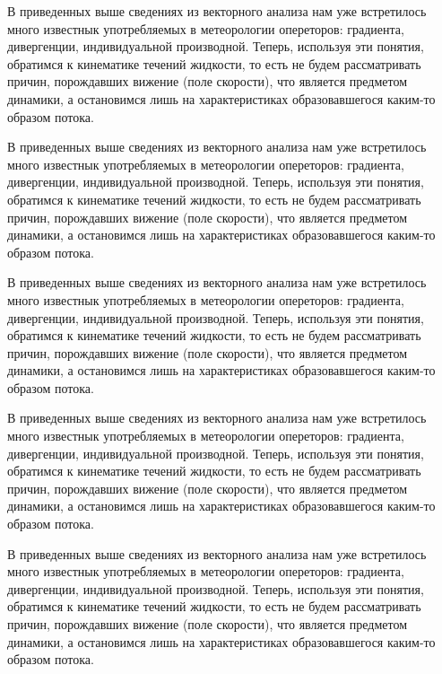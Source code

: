 \begin{boxB}
В приведенных выше сведениях из векторного анализа нам уже встретилось много известнык употребляемых в метеорологии  опереторов: градиента, дивергенции, индивидуальной производной. Теперь, используя эти понятия, обратимся к кинематике течений жидкости, то есть не будем рассматривать причин, порождавших вижение (поле скорости), что является предметом динамики, а остановимся лишь на характеристиках образовавшегося каким-то образом потока.
\end{boxB}

\begin{boxC}
В приведенных выше сведениях из векторного анализа нам уже встретилось много известнык употребляемых в метеорологии  опереторов: градиента, дивергенции, индивидуальной производной. Теперь, используя эти понятия, обратимся к кинематике течений жидкости, то есть не будем рассматривать причин, порождавших вижение (поле скорости), что является предметом динамики, а остановимся лишь на характеристиках образовавшегося каким-то образом потока.
\end{boxC}

\begin{boxD}
В приведенных выше сведениях из векторного анализа нам уже встретилось много известнык употребляемых в метеорологии  опереторов: градиента, дивергенции, индивидуальной производной. Теперь, используя эти понятия, обратимся к кинематике течений жидкости, то есть не будем рассматривать причин, порождавших вижение (поле скорости), что является предметом динамики, а остановимся лишь на характеристиках образовавшегося каким-то образом потока.
\end{boxD}

\begin{boxE}
В приведенных выше сведениях из векторного анализа нам уже встретилось много известнык употребляемых в метеорологии  опереторов: градиента, дивергенции, индивидуальной производной. Теперь, используя эти понятия, обратимся к кинематике течений жидкости, то есть не будем рассматривать причин, порождавших вижение (поле скорости), что является предметом динамики, а остановимся лишь на характеристиках образовавшегося каким-то образом потока.
\end{boxE}

\begin{boxF}
В приведенных выше сведениях из векторного анализа нам уже встретилось много известнык употребляемых в метеорологии  опереторов: градиента, дивергенции, индивидуальной производной. Теперь, используя эти понятия, обратимся к кинематике течений жидкости, то есть не будем рассматривать причин, порождавших вижение (поле скорости), что является предметом динамики, а остановимся лишь на характеристиках образовавшегося каким-то образом потока.
\end{boxF}

